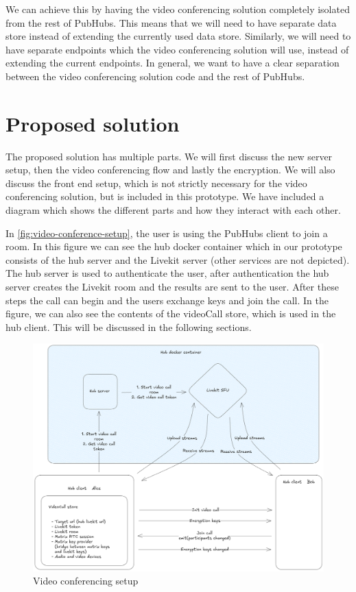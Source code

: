 \documentclass{report}
\begin{document}
We can achieve this by having the video conferencing solution completely isolated from the rest of PubHubs.
This means that we will need to have separate data store instead of extending the currently used data store.
Similarly, we will need to have separate endpoints which the video conferencing solution will use,
instead of extending the current endpoints. In general, we want to have a clear separation between the video conferencing
solution code and the rest of PubHubs.

\chapter{Proposed solution}
The proposed solution has multiple parts. We will first discuss the new server setup, then the video conferencing flow
and lastly the encryption. We will also discuss the front end setup, which is not strictly necessary for the video
conferencing solution, but is included in this prototype. We have included a diagram which shows the different parts
and how they interact with each other.

In \autoref{fig:video-conference-setup}, the user is using the PubHubs client to join a room. In this figure we can see
the hub docker container which in our prototype consists of the hub server and the Livekit server (other services
are not depicted). The hub server is used to authenticate the user, after authentication the hub server creates the
Livekit room and the results are sent to the user. After these steps the call can begin and the users exchange keys
and join the call. In the figure, we can also see the contents of the videoCall store, which is used in the hub
client. This will be discussed in the following sections.

\begin{figure}[!hbt]
\centering
\includegraphics[width=1\textwidth]{img/PH_videocall.excalidraw.png}
\caption{Video conferencing setup}
\label{fig:video-conference-setup}
\end{figure}
\end{document}
